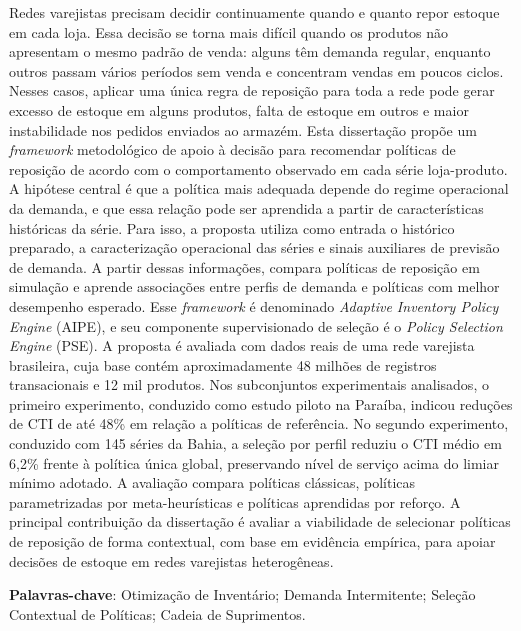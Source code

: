 Redes varejistas precisam decidir continuamente quando e quanto repor estoque em cada loja. Essa decisão se torna mais difícil quando os produtos não apresentam o mesmo padrão de venda: alguns têm demanda regular, enquanto outros passam vários períodos sem venda e concentram vendas em poucos ciclos. Nesses casos, aplicar uma única regra de reposição para toda a rede pode gerar excesso de estoque em alguns produtos, falta de estoque em outros e maior instabilidade nos pedidos enviados ao armazém.
Esta dissertação propõe um \textit{framework} metodológico de apoio à decisão para recomendar políticas de reposição de acordo com o comportamento observado em cada série loja-produto. A hipótese central é que a política mais adequada depende do regime operacional da demanda, e que essa relação pode ser aprendida a partir de características históricas da série. Para isso, a proposta utiliza como entrada o histórico preparado, a caracterização operacional das séries e sinais auxiliares de previsão de demanda. A partir dessas informações, compara políticas de reposição em simulação e aprende associações entre perfis de demanda e políticas com melhor desempenho esperado. Esse \textit{framework} é denominado \textit{Adaptive Inventory Policy Engine} (AIPE), e seu componente supervisionado de seleção é o \textit{Policy Selection Engine} (PSE).
A proposta é avaliada com dados reais de uma rede varejista brasileira, cuja base contém aproximadamente 48 milhões de registros transacionais e 12 mil produtos. Nos subconjuntos experimentais analisados, o primeiro experimento, conduzido como estudo piloto na Paraíba, indicou reduções de CTI de até 48\% em relação a políticas de referência. No segundo experimento, conduzido com 145 séries da Bahia, a seleção por perfil reduziu o CTI médio em 6,2\% frente à política única global, preservando nível de serviço acima do limiar mínimo adotado. A avaliação compara políticas clássicas, políticas parametrizadas por meta-heurísticas e políticas aprendidas por reforço.
A principal contribuição da dissertação é avaliar a viabilidade de selecionar políticas de reposição de forma contextual, com base em evidência empírica, para apoiar decisões de estoque em redes varejistas heterogêneas.

\vspace{2em}
\textbf{Palavras-chave}: Otimização de Inventário; Demanda Intermitente; Seleção Contextual de Políticas; Cadeia de Suprimentos.
